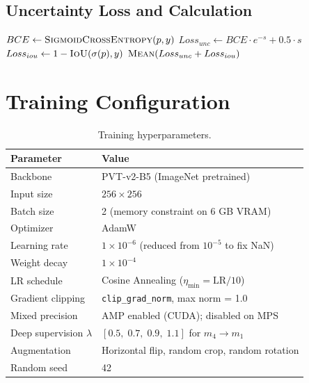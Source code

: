 \documentclass[12pt,a4paper]{report}
\begin{document}
\subsection{Uncertainty Loss and Calculation}

\begin{algorithm}[H]
\caption{Aleatoric Uncertainty Loss}
\begin{algorithmic}[1]
    \State $BCE \gets \Call{SigmoidCrossEntropy}{p, y}$
    \State $Loss_{unc} \gets BCE \cdot e^{-s} + 0.5 \cdot s$ 
    \State $Loss_{iou} \gets 1 - \Call{IoU}{\sigma(p), y}$
    \State \Return $\Call{Mean}{Loss_{unc} + Loss_{iou}}$
\EndProcedure
\end{algorithmic}
\end{algorithm}

\section{Training Configuration}

\begin{table}[H]
\centering
\caption{Training hyperparameters.}
\label{tab:hparams}
\begin{tabular}{@{}ll@{}}
\toprule
\textbf{Parameter} & \textbf{Value} \\
\midrule
Backbone               & PVT-v2-B5 (ImageNet pretrained) \\
Input size             & $256 \times 256$ \\
Batch size             & 2 (memory constraint on 6 GB VRAM) \\
Optimizer              & AdamW \\
Learning rate          & $1\times10^{-6}$ (reduced from $10^{-5}$ to fix NaN) \\
Weight decay           & $1\times10^{-4}$ \\
LR schedule            & Cosine Annealing ($\eta_{\min} = \text{LR}/10$) \\
Gradient clipping      & \texttt{clip\_grad\_norm}, max norm = 1.0 \\
Mixed precision        & AMP enabled (CUDA); disabled on MPS \\
Deep supervision $\lambda$ & $[0.5,\; 0.7,\; 0.9,\; 1.1]$ for $m_4 \to m_1$ \\
Augmentation           & Horizontal flip, random crop, random rotation \\
Random seed            & 42 \\
\bottomrule
\end{tabular}
\end{table}
\end{document}
